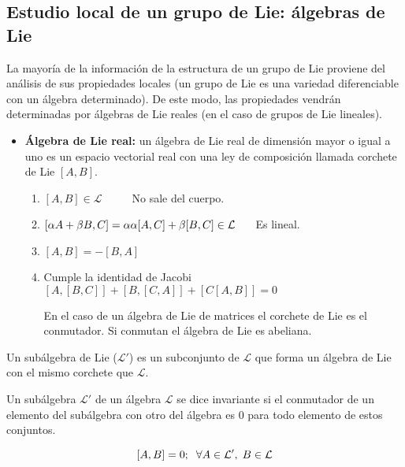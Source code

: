 \documentclass{article}
\begin{document}
     \subsection{Estudio local de un grupo de Lie: álgebras de Lie}

     La mayoría de la información de la estructura de un grupo de Lie proviene del análisis de sus propiedades locales (un grupo de Lie es una variedad diferenciable con un álgebra determinado). De este modo, las propiedades vendrán determinadas por álgebras de Lie reales (en el caso de grupos de Lie lineales).

     \begin{itemize}
         \item \textbf{Álgebra de Lie real:} un álgebra de Lie real de dimensión mayor o igual a uno es un espacio vectorial real con una ley de composición llamada corchete de Lie $[A,B]$.

         \begin{enumerate}

             \item $[A,B] \in \mathcal{L} \hspace{1cm}$ No sale del cuerpo.

             \item $[\alpha A + \beta B,C]=\alpha \alpha[A,C] + \beta [B,C] \in \mathcal{ L} \hspace{0.5cm}$ Es lineal.

            \item $[A,B]=-[B,A]$

            \item Cumple la identidad de Jacobi $[A,[B,C]]+[B,[C,A]]+[C[A,B]]=0$

            En el caso de un álgebra de Lie de matrices el corchete de Lie es el conmutador. Si conmutan el álgebra de Lie es abeliana.
             \end{enumerate}
     \end{itemize}

     Un subálgebra de Lie ($\mathcal{L}'$) es un subconjunto de $\mathcal{L}$ que forma un álgebra de Lie con el mismo corchete que $\mathcal{L}$.

     Un subálgebra $\mathcal{L}'$  de un álgebra $\mathcal{L}$ se dice invariante si el conmutador de un elemento del subálgebra con otro del álgebra es 0 para todo elemento de estos conjuntos.

     $$[A,B]=0; \hspace{0.2cm} \forall A\in \mathcal{L}' , \hspace{0.1cm} B \in \mathcal{L}$$
\end{document}
